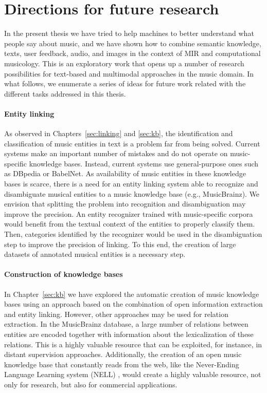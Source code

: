 \section{Directions for future research}
\label{sec:conclusion:future}

In the present thesis we have tried to help machines to better understand what people say about music, and we have shown how to combine semantic knowledge, texts, user feedback, audio, and images in the context of MIR and computational musicology. This is an exploratory work that opens up a number of research possibilities for text-based and multimodal approaches in the music domain. In what follows, we enumerate a series of ideas for future work related with the different tasks addressed in this thesis.

\paragraph{Entity linking} As observed in Chapters~\ref{sec:linking} and \ref{sec:kb}, the identification and classification of music entities in text is a problem far from being solved. Current systems make an important number of mistakes and do not operate on music-specific knowledge bases. Instead, current systems use general-purpose ones such as DBpedia or BabelNet. As availability of music entities in these knowledge bases is scarce, there is a need for an entity linking system able to recognize and disambiguate musical entities to a music knowledge base (e.g., MusicBrainz). We envision that splitting the problem into recognition and disambiguation may improve the precision. An entity recognizer trained with music-specific corpora would benefit from the textual context of the entities to properly classify them. Then, categories identified by the recognizer would be used in the disambiguation step to improve the precision of linking. To this end, the creation of large datasets of annotated musical entities is a necessary step. %

\paragraph{Construction of knowledge bases} In Chapter~\ref{sec:kb} we have explored the automatic creation of music knowledge bases using an approach based on the combination of open information extraction and entity linking. However, other approaches may be used for relation extraction. In the MusicBrainz database,  a large number of relations between entities are encoded together with information about the lexicalization of these relations. This is a highly valuable resource that can be exploited, for instance, in distant supervision approaches. Additionally, the creation of an open music knowledge base that constantly reads from the web, like the Never-Ending Language Learning system (NELL) \citep{Carlson2010a}, would create a highly valuable resource, not only for research, but also for commercial applications.

